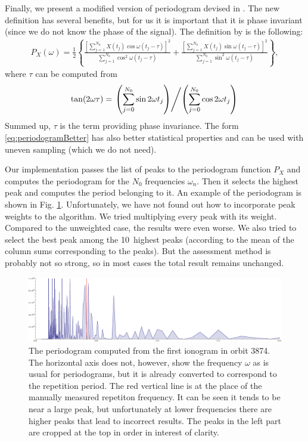 Finally, we present a modified version of periodogram devised in \citep{Scargle1982}. The new definition has several benefits, but for us it is important that it is phase invariant (since we do not know the phase of the signal). The definition by \citep[p.~838]{Scargle1982} is the following:
\begin{align}
P_X(\omega) = \frac{1}{2} \left\lbrace \frac{\left[ \sum\limits_{j=1}^{N_0} X(t_j)\cos\omega (t_j - \tau) \right]^2}{\sum\limits_{j=1}^{N_0} \cos^2\omega (t_j - \tau)} + \frac{\left[\sum\limits_{j=1}^{N_0} X(t_j)\sin\omega (t_j - \tau) \right]^2}{\sum\limits_{j=1}^{N_0} \sin^2\omega (t_j - \tau)} \right\rbrace,
\label{eq:periodogramBetter}
\end{align} 
where $\tau$ can be computed from
\begin{align}
\tan(2\omega\tau) = \left. \left(\sum\limits_{j=0}^{N_0} \sin 2\omega t_j \right) \middle/ \left(\sum\limits_{j=0}^{N_0} \cos 2\omega t_j \right) \right.
\end{align} 
Summed up, $\tau$ is the term providing phase invariance. The form \eqref{eq:periodogramBetter} has also better statistical properties and can be used with uneven sampling (which we do not need)\citep[p.~849]{Scargle1982}.

Our implementation passes the list of peaks to the periodogram function $P_X$ and computes the periodogram for the $N_0$ frequencies $\omega_n$. Then it selects the highest peak and computes the period belonging to it. An example of the periodogram is shown in Fig. \ref{fig:periodogram}. Unfortunately, we have not found out how to incorporate peak weights to the algorithm. We tried multiplying every peak with its weight. Compared to the unweighted case, the results were even worse. We also tried to select the best peak among the 10~highest peaks (according to the mean of the column sums corresponding to the peaks). But the assessment method is probably not so strong, so in most cases the total result remains unchanged. 

\begin{figure}
	\centering
	\includegraphics[width=140mm]{images/periodogram_from_normalized_peaks_orbit_3874_000.eps}
	\caption{The periodogram computed from the first ionogram in orbit 3874. The horizontal axis does not, however, show the frequency $\omega$ as is usual for periodograms, but it is already converted to correspond to the repetition period. The red vertical line is at the place of the manually measured repetiton frequency. It can be seen it tends to be near a large peak, but unfortunately at lower frequencies there are higher peaks that lead to incorrect results. The peaks in the left part are cropped at the top in order in interest of clarity.}
	\label{fig:periodogram}
\end{figure}
 
